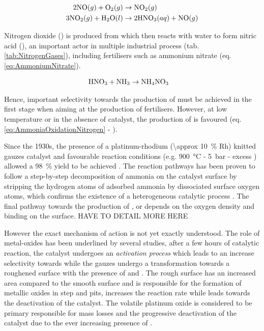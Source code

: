 \begin{align}
    \label{eq:Stage2}
    2 \nitricoxide (g) + \dioxygen (g) & \rightarrow \nitrogendioxide (g) \\
    \label{eq:Stage3}
    3 \nitrogendioxide (g) + \water (l) & \rightarrow 2\nitricacid (aq) + \nitricoxide (g)
\end{align}

Nitrogen dioxide (\nitrogendioxide) is produced from \nitricoxide which then reacts with water to form nitric acid (\nitricacid), an important actor in multiple industrial process (tab. \ref{tab:NitrogenGases}), including fertilisers such as ammonium nitrate (eq. \ref{eq:AmmoniumNitrate}).

\begin{align}
    \label{eq:AmmoniumNitrate}
    \nitricacid + \ammonia & \rightarrow \ammoniumnitrate
\end{align}

Hence, important selectivity towards the production of \nitricoxide must be achieved in the first stage when aiming at the production of fertilisers.
However, at low temperature or in the absence of catalyst, the production of \nitrogen is favoured (eq. \ref{eq:AmmoniaOxidationNitrogen} - \cite{Hatscher2008}).

Since the 1930s, the presence of a platinum-rhodium (\qty{\approx 10}{\percent} Rh) knitted gauzes catalyst and favourable reaction conditions (e.g. \qty{900}{\degreeCelsius} - \qty{5}{\bar} - excess \dioxygen) allowed a \qty{98}{\percent} \nitricoxide yield to be achieved \parencite{Handforth1934, Heck1982}.
The reaction pathways has been proven to follow a step-by-step decomposition of ammonia on the catalyst surface by stripping the hydrogen atoms of adsorbed ammonia by dissociated surface oxygen atoms, which confirms the existence of a heterogeneous catalytic process \parencite{Bradley1995,PEREZRAMIREZ2004}.
The final pathway towards the production of \nitrogen, \nitrousoxide or \nitricoxide depends on the oxygen density and binding on the surface.
HAVE TO DETAIL MORE HERE

However the exact mechanism of action is not yet exactly understood.
The role of metal-oxides has been underlined by several studies, after a few hours of catalytic reaction, the catalyst undergoes an \textit{activation process} which leads to an increase selectivity towards \nitricoxide while the gauzes undergo a transformation towards a roughened surface with the presence of  and .
The rough surface has an increased area compared to the smooth surface and is responsible for the formation of metallic oxides in step and pits,  increases the reaction rate while  leads towards the deactivation of the catalyst.
The volatile platinum oxide is considered to be primary responsible for mass losses and the progressive deactivation of the catalyst due to the ever increasing presence of  \parencite{McCabe1986}.

